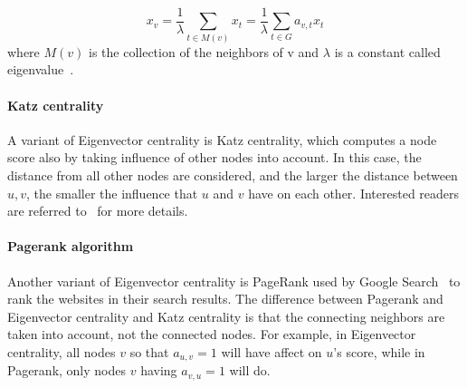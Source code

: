 \begin{equation}
	\label{eq:eigenvector}
	x_v = \frac{1}{\lambda} \sum_{t \in M(v)}x_t = \frac{1}{\lambda} \sum_{t \in G} a_{v,t}x_t
\end{equation}
where $M(v)$ is the collection of the neighbors of v and $\lambda$ is a constant called eigenvalue~\cite{Eigenvecto-wiki}.


\paragraph{Katz centrality} A variant of Eigenvector centrality is Katz centrality, which computes a node score also by taking influence of other nodes into account. In this case, the distance from all other nodes are considered, and the larger the distance between $u, v$, the smaller the influence that $u$ and $v$ have on each other. Interested readers are referred to~\cite{katz-wiki} for more details.

\paragraph{Pagerank algorithm} Another variant of Eigenvector centrality is PageRank used by Google Search~\cite{pagerank-wiki} to rank the websites in their search results. The difference between Pagerank and Eigenvector centrality and Katz centrality is that the connecting neighbors are taken into account, not the connected nodes. For example, in Eigenvector centrality, all nodes $v$ so that $a_{u, v}= 1$ will have affect on $u$'s score, while in Pagerank, only nodes $v$ having $a_{v, u} = 1$ will do.
